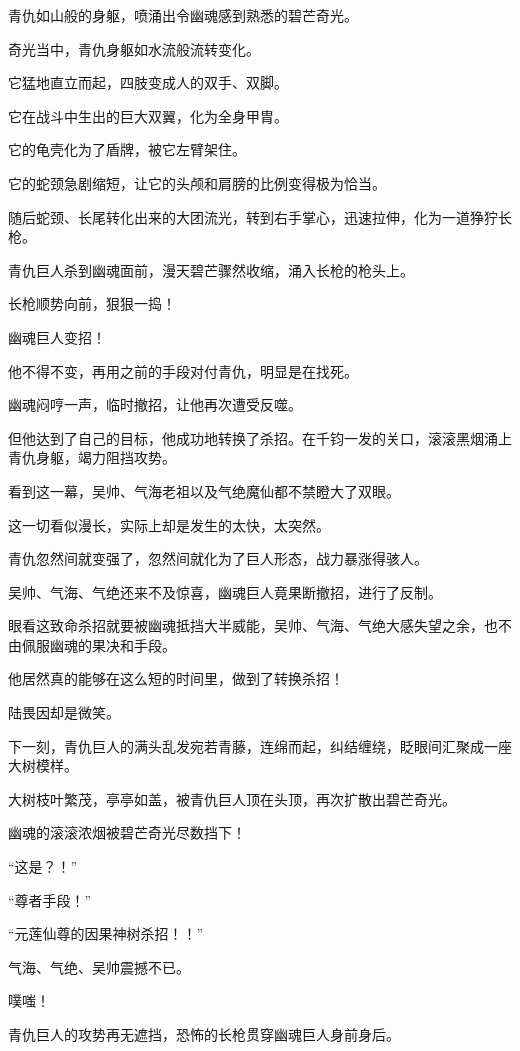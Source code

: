 \begin{this_body}
青仇如山般的身躯，喷涌出令幽魂感到熟悉的碧芒奇光。

奇光当中，青仇身躯如水流般流转变化。

它猛地直立而起，四肢变成人的双手、双脚。

它在战斗中生出的巨大双翼，化为全身甲胄。

它的龟壳化为了盾牌，被它左臂架住。

它的蛇颈急剧缩短，让它的头颅和肩膀的比例变得极为恰当。

随后蛇颈、长尾转化出来的大团流光，转到右手掌心，迅速拉伸，化为一道狰狞长枪。

青仇巨人杀到幽魂面前，漫天碧芒骤然收缩，涌入长枪的枪头上。

长枪顺势向前，狠狠一捣！

幽魂巨人变招！

他不得不变，再用之前的手段对付青仇，明显是在找死。

幽魂闷哼一声，临时撤招，让他再次遭受反噬。

但他达到了自己的目标，他成功地转换了杀招。在千钧一发的关口，滚滚黑烟涌上青仇身躯，竭力阻挡攻势。

看到这一幕，吴帅、气海老祖以及气绝魔仙都不禁瞪大了双眼。

这一切看似漫长，实际上却是发生的太快，太突然。

青仇忽然间就变强了，忽然间就化为了巨人形态，战力暴涨得骇人。

吴帅、气海、气绝还来不及惊喜，幽魂巨人竟果断撤招，进行了反制。

眼看这致命杀招就要被幽魂抵挡大半威能，吴帅、气海、气绝大感失望之余，也不由佩服幽魂的果决和手段。

他居然真的能够在这么短的时间里，做到了转换杀招！

陆畏因却是微笑。

下一刻，青仇巨人的满头乱发宛若青藤，连绵而起，纠结缠绕，眨眼间汇聚成一座大树模样。

大树枝叶繁茂，亭亭如盖，被青仇巨人顶在头顶，再次扩散出碧芒奇光。

幽魂的滚滚浓烟被碧芒奇光尽数挡下！

“这是？！”

“尊者手段！”

“元莲仙尊的因果神树杀招！！”

气海、气绝、吴帅震撼不已。

噗嗤！

青仇巨人的攻势再无遮挡，恐怖的长枪贯穿幽魂巨人身前身后。


\end{this_body}
